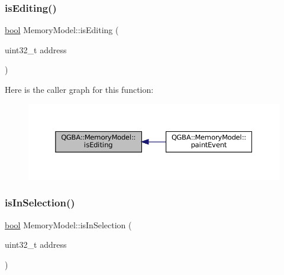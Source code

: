\subsubsection{\texorpdfstring{is\+Editing()}{isEditing()}}
{\footnotesize\ttfamily \mbox{\hyperlink{libretro_8h_a4a26dcae73fb7e1528214a068aca317e}{bool}} Memory\+Model\+::is\+Editing (\begin{DoxyParamCaption}\item[{uint32\+\_\+t}]{address }\end{DoxyParamCaption})\hspace{0.3cm}{\ttfamily [private]}}

Here is the caller graph for this function\+:
\nopagebreak
\begin{figure}[H]
\begin{center}
\leavevmode
\includegraphics[width=350pt]{class_q_g_b_a_1_1_memory_model_a6955aff7cf9ed1ef196aafdb0779707a_icgraph}
\end{center}
\end{figure}
\mbox{\label{class_q_g_b_a_1_1_memory_model_a366e54f712353b0e3838decfd05e240c}} 
\subsubsection{\texorpdfstring{is\+In\+Selection()}{isInSelection()}}
{\footnotesize\ttfamily \mbox{\hyperlink{libretro_8h_a4a26dcae73fb7e1528214a068aca317e}{bool}} Memory\+Model\+::is\+In\+Selection (\begin{DoxyParamCaption}\item[{uint32\+\_\+t}]{address }\end{DoxyParamCaption})\hspace{0.3cm}{\ttfamily [private]}}

